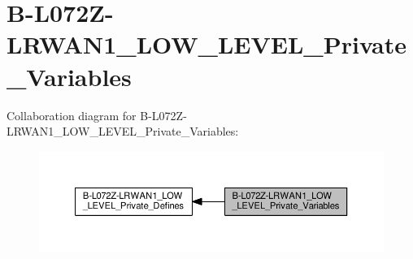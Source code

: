 \hypertarget{group__B-L072Z-LRWAN1__LOW__LEVEL__Private__Variables}{}\section{B-\/\+L072\+Z-\/\+L\+R\+W\+A\+N1\+\_\+\+L\+O\+W\+\_\+\+L\+E\+V\+E\+L\+\_\+\+Private\+\_\+\+Variables}
\label{group__B-L072Z-LRWAN1__LOW__LEVEL__Private__Variables}
Collaboration diagram for B-\/\+L072\+Z-\/\+L\+R\+W\+A\+N1\+\_\+\+L\+O\+W\+\_\+\+L\+E\+V\+E\+L\+\_\+\+Private\+\_\+\+Variables\+:
\nopagebreak
\begin{figure}[H]
\begin{center}
\leavevmode
\includegraphics[width=350pt]{group__B-L072Z-LRWAN1__LOW__LEVEL__Private__Variables}
\end{center}
\end{figure}

